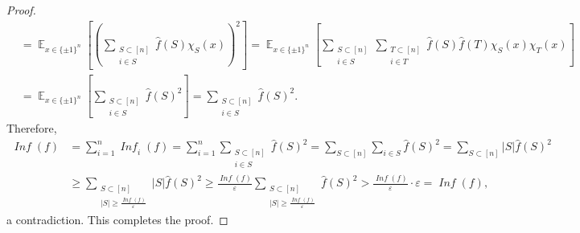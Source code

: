 \documentclass[letterpaper, reqno,11pt]{article}
\newcommand{\EE}{\mathop{{}\mathbb{E}}}
\DeclareMathOperator{\Inf}{\mathit{Inf}}
\begin{document}
\begin{enumerate}
\begin{enumerate}
\begin{proof}
\begin{align*}
        &= \EE_{x \in \{ \pm 1 \}^n}\left[\left(\sum_{\substack{S \subset [n] \\ i \in S}} \hat{f}(S) \chi_S(x)\right)^2\right] = \EE_{x \in \{ \pm 1 \}^n}\left[\sum_{\substack{S \subset [n] \\ i \in S}} \sum_{\substack{T \subset [n] \\ i \in T}} \hat{f}(S) \hat{f}(T) \chi_S(x) \chi_T(x)\right] \\
        &= \EE_{x \in \{ \pm 1 \}^n}\left[\sum_{\substack{S \subset [n] \\ i \in S}} \hat{f}(S)^2\right] = \sum_{\substack{S \subset [n] \\ i \in S}} \hat{f}(S)^2.
      \end{align*}
      Therefore,
      \begin{align*}
        \Inf(f) &= \sum_{i = 1}^n \Inf_i(f) = \sum_{i = 1}^n \sum_{\substack{S \subset [n] \\ i \in S}} \hat{f}(S)^2 = \sum_{S \subset [n]} \sum_{i \in S} \hat{f}(S)^2 = \sum_{S \subset [n]} |S| \hat{f}(S)^2 \\
        &\geq \sum_{\substack{S \subset [n] \\ |S| \geq \frac{\Inf(f)}{\varepsilon}}} |S| \hat{f}(S)^2 \geq \frac{\Inf(f)}{\varepsilon} \sum_{\substack{S \subset [n] \\ |S| \geq \frac{\Inf(f)}{\varepsilon}}} \hat{f}(S)^2 > \frac{\Inf(f)}{\varepsilon} \cdot \varepsilon = \Inf(f),
      \end{align*}
      a contradiction. This completes the proof.
    \end{proof}
  \end{enumerate}
\end{enumerate}
\end{document}
